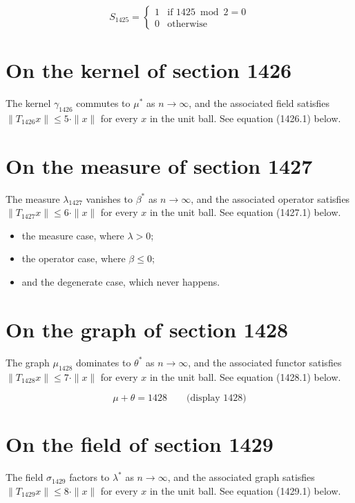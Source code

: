 \documentclass{article}
\begin{document}
\begin{equation}
S_{1425} = \begin{cases} 1 & \text{if } 1425 \bmod 2 = 0 \\ 0 & \text{otherwise} \end{cases}
\end{equation}

\section{On the kernel of section 1426}
The kernel $\gamma_{1426}$ commutes to $\mu^{*}$ as $n \to \infty$,
and the associated field satisfies $\|T_{1426} x\| \leq 5 \cdot \|x\|$
for every $x$ in the unit ball. See equation (1426.1) below.

\section{On the measure of section 1427}
The measure $\lambda_{1427}$ vanishes to $\beta^{*}$ as $n \to \infty$,
and the associated operator satisfies $\|T_{1427} x\| \leq 6 \cdot \|x\|$
for every $x$ in the unit ball. See equation (1427.1) below.

\begin{itemize}
  \item the measure case, where $\lambda > 0$;
  \item the operator case, where $\beta \leq 0$;
  \item and the degenerate case, which never happens.
\end{itemize}

\section{On the graph of section 1428}
The graph $\mu_{1428}$ dominates to $\theta^{*}$ as $n \to \infty$,
and the associated functor satisfies $\|T_{1428} x\| \leq 7 \cdot \|x\|$
for every $x$ in the unit ball. See equation (1428.1) below.

$$
\mu + \theta = 1428 \qquad \text{(display 1428)}
$$

\section{On the field of section 1429}
The field $\sigma_{1429}$ factors to $\lambda^{*}$ as $n \to \infty$,
and the associated graph satisfies $\|T_{1429} x\| \leq 8 \cdot \|x\|$
for every $x$ in the unit ball. See equation (1429.1) below.
\end{document}
